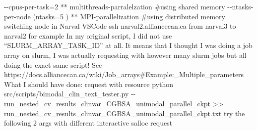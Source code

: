 \documentclass{article}%
\begin{document}
%
{-}{-}cpus{-}per{-}task=2  ** multithreads{-}parralelzation \#using shared memory %
\newline%
\newline%
%
{-}{-}ntasks{-}per{-}node (ntasks=5 ) ** MPI{-}parallelization \#using distributed memory%
\newline%
\newline%
%
%
\newline%
\newline%
%
switching node in Narval VSCode %
\newline%
\newline%
%
ssh narval2.alliancecan.ca%
\newline%
\newline%
%
from narval3 to narval2 for example%
\newline%
\newline%
%
In my original script, I did not use “SLURM\_ARRAY\_TASK\_ID” at all. It means that I thought I was doing a job array on slurm, I was actually requesting with however many slurm jobs but all doing the exact same script! %
\newline%
\newline%
%
See https://docs.alliancecan.ca/wiki/Job\_arrays\#Example:\_Multiple\_parameters %
\newline%
\newline%
%
What I should have done: %
\newline%
\newline%
%
%
\newline%
\newline%
%
%
\newline%
\newline%
%
%
\newline%
\newline%
%
request with resource %
\newline%
\newline%
%
%
\newline%
\newline%
%
%
\newline%
\newline%
%
python src/scripts/bimodal\_clin\_text\_tester.py {-}{-}run\_nested\_cv\_results\_clinvar\_CGBSA\_unimodal\_parallel\_ckpt >> run\_nested\_cv\_results\_clinvar\_CGBSA\_unimodal\_parallel\_ckpt.txt%
\newline%
\newline%
%
%
\newline%
\newline%
%
try the following 2 args with different interactive salloc request %
\end{document}
